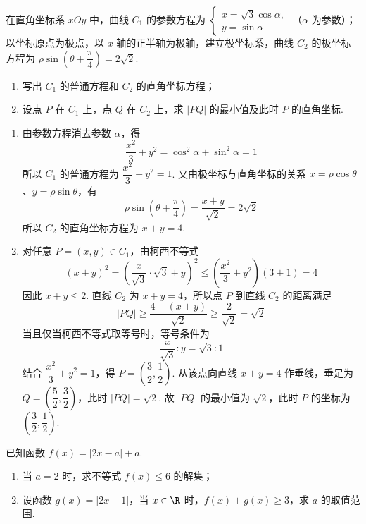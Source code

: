 \begin{problem}
在直角坐标系 \(xOy\) 中，曲线 \(C_1\) 的参数方程为
\(\begin{cases}
x=\sqrt3\cos\alpha,\\
y=\sin\alpha
\end{cases}\)
（\(\alpha\) 为参数）；以坐标原点为极点，以 \(x\) 轴的正半轴为极轴，建立极坐标系，曲线 \(C_2\) 的极坐标方程为 \(\rho\sin\left(\theta+\dfrac\pi4\right)=2\sqrt2\).

\begin{enumerate}
\item 写出 \(C_1\) 的普通方程和 \(C_2\) 的直角坐标方程；
\item 设点 \(P\) 在 \(C_1\) 上，点 \(Q\) 在 \(C_2\) 上，求 \(|PQ|\) 的最小值及此时 \(P\) 的直角坐标.
\end{enumerate}
\end{problem}

\begin{solution}
\begin{enumerate}
\item 由参数方程消去参数 \(\alpha\)，得
\[
\frac{x^2}{3}+y^2=\cos^2\alpha+\sin^2\alpha=1
\]
所以 \(C_1\) 的普通方程为 \(\dfrac{x^2}{3}+y^2=1\). 又由极坐标与直角坐标的关系 \(x=\rho\cos\theta\)、\(y=\rho\sin\theta\)，有
\[
\rho\sin\left(\theta+\frac\pi4\right)=\frac{x+y}{\sqrt2}=2\sqrt2
\]
所以 \(C_2\) 的直角坐标方程为 \(x+y=4\).

\item 对任意 \(P=(x,y)\in C_1\)，由柯西不等式
\[
(x+y)^2=\left(\frac{x}{\sqrt3}\cdot\sqrt3+y\right)^2\le\left(\frac{x^2}{3}+y^2\right)(3+1)=4
\]
因此 \(x+y\le2\). 直线 \(C_2\) 为 \(x+y=4\)，所以点 \(P\) 到直线 \(C_2\) 的距离满足
\[
|PQ|\ge\frac{4-(x+y)}{\sqrt2}\ge\frac{2}{\sqrt2}=\sqrt2
\]
当且仅当柯西不等式取等号时，等号条件为
\[
\frac{x}{\sqrt3}:y=\sqrt3:1
\]
结合 \(\dfrac{x^2}{3}+y^2=1\)，得 \(P=\left(\dfrac32,\dfrac12\right)\). 从该点向直线 \(x+y=4\) 作垂线，垂足为 \(Q=\left(\dfrac52,\dfrac32\right)\)，此时 \(|PQ|=\sqrt2\). 故 \(|PQ|\) 的最小值为 \(\sqrt2\)，此时 \(P\) 的坐标为 \(\left(\dfrac32,\dfrac12\right)\).
\end{enumerate}
\end{solution}

\begin{problem}
已知函数 \(f(x)=|2x-a|+a\).

\begin{enumerate}
\item 当 \(a=2\) 时，求不等式 \(f(x)\le6\) 的解集；
\item 设函数 \(g(x)=|2x-1|\)，当 \(x\in\R\) 时，\(f(x)+g(x)\ge3\)，求 \(a\) 的取值范围.
\end{enumerate}
\end{problem}

